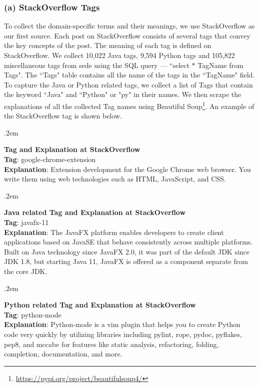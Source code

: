 \subsubsection{(a) StackOverflow Tags}
To collect the domain-specific terms and their meanings, we use StackOverflow as our first source. Each post on StackOverflow consists of several tags that convey the key concepts of the post. The meaning of each tag is defined on StackOverflow. We collect 10,022 Java tags, 9,594 Python tags and 105,822 miscellaneous tags from \acrfull{sede} using the SQL query --- ``select $*$ TagName from Tags". The ``Tags" table contains all the name of the tags in the ``TagName" field. To capture the Java or Python related tags, we collect a list of Tags that contain the keyword ``Java" and ``Python" or "py" in their names. We then scrape the explanations of all the collected Tag names using Beautiful Soup\footnote{\url{https://pypi.org/project/beautifulsoup4/}}. An example of the StackOverflow tag is shown below.\par

\FrameSep.2em
\begin{frshaded}
\label{sotag}
\noindent
\textbf{Tag and Explanation at StackOverflow}\\
\textbf{Tag}: google-chrome-extension \\
\textbf{Explanation}: Extension development for the Google Chrome web browser. You write them using web technologies such as HTML, JavaScript, and CSS.
\end{frshaded}

\FrameSep.2em
\begin{frshaded}
\label{sotag2}
\noindent
\textbf{Java related Tag and Explanation at StackOverflow}\\
\textbf{Tag}: javafx-11 \\
\textbf{Explanation}: The JavaFX platform enables developers to create client applications based on JavaSE that behave consistently across multiple platforms. Built on Java technology since JavaFX 2.0, it was part of the default JDK since JDK 1.8, but starting Java 11, JavaFX is offered as a component separate from the core JDK.
\end{frshaded}

\FrameSep.2em
\begin{frshaded}
\label{sotag3}
\noindent
\textbf{Python related Tag and Explanation at StackOverflow}\\
\textbf{Tag}: python-mode \\
\textbf{Explanation}: Python-mode is a vim plugin that helps you to create Python code very quickly by utilizing libraries including pylint, rope, pydoc, pyflakes, pep8, and mccabe for features like static analysis, refactoring, folding, completion, documentation, and more.
\end{frshaded}

